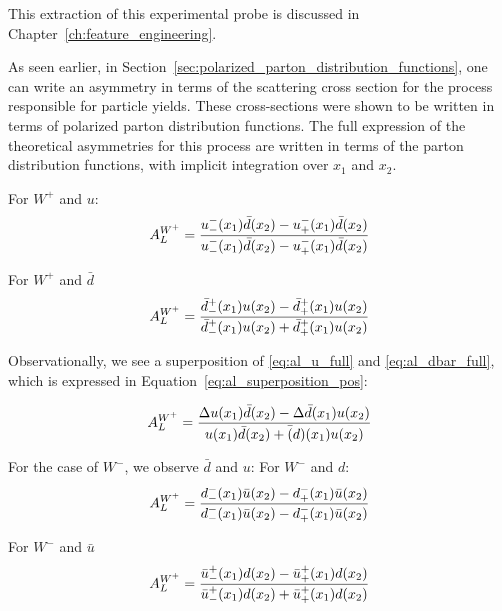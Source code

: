 This extraction of this experimental probe is discussed in
Chapter~\ref{ch:feature_engineering}.

As seen earlier, in Section~\ref{sec:polarized_parton_distribution_functions},
one can write an asymmetry in terms of the scattering cross section for the
process responsible for particle yields. These cross-sections were shown to be
written in terms of polarized parton distribution functions. The full expression
of the theoretical asymmetries for this process are written in terms of the
parton distribution functions, with implicit integration over $x_1$ and $x_2$.

For $W^+$ and $u$:
\begin{equation}
  {A_L^{W^+}} = 
  {
    {u_-^-(x_1)\bar{d}(x_2)-u_+^-(x_1)\bar{d}(x_2)}
    \over
    {u_-^-(x_1)\bar{d}(x_2)-u_+^-(x_1)\bar{d}(x_2)}
  }  
  \label{eq:al_u_full}
\end{equation}

For $W^+$ and $\bar{d}$
\begin{equation}
  {A_L^{W^+}} = 
  {
    {\bar{d}_-^+(x_1)u(x_2)-\bar{d}_+^+(x_1)u(x_2)}
    \over
    {\bar{d}_-^+(x_1)u(x_2)+\bar{d}_+^+(x_1)u(x_2)}
  }  
  \label{eq:al_dbar_full}
\end{equation}

Observationally, we see a superposition of \ref{eq:al_u_full} and
\ref{eq:al_dbar_full}, which is expressed in
Equation~\ref{eq:al_superposition_pos}:

\begin{equation}
  {A_L^{W^+}} = 
  {
    {
      \Delta u(x_1)\bar{d}(x_2)-\Delta \bar{d}(x_1)u(x_2)
    }
    \over
    {
      u(x_1)\bar d(x_2)+\bar(d)(x_1)u(x_2)
    }
  }
  \label{eq:al_superposition_pos}
\end{equation}

For the case of $W^-$, we observe $\bar{d}$ and $u$:
For $W^-$ and $d$:
\begin{equation}
  {A_L^{W^+}} = 
  {
    {d_-^-(x_1)\bar{u}(x_2)-d_+^-(x_1)\bar{u}(x_2)}
    \over
    {d_-^-(x_1)\bar{u}(x_2)-d_+^-(x_1)\bar{u}(x_2)}
  }  
  \label{eq:al_d_full}
\end{equation}

For $W^-$ and $\bar{u}$
\begin{equation}
  {A_L^{W^+}} = 
  {
    {\bar{u}_-^+(x_1)d(x_2)-\bar{u}_+^+(x_1)d(x_2)}
    \over
    {\bar{u}_-^+(x_1)d(x_2)+\bar{u}_+^+(x_1)d(x_2)}
  }  
  \label{eq:al_ubar_full}
\end{equation}

